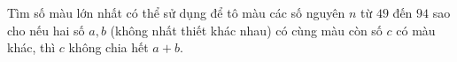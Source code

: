 \ifshowproblem
\begin{problem}\label{example:THA-2015-TSTST-E-P3}
    Tìm số màu lớn nhất có thể sử dụng để tô màu các số nguyên \( n \) từ \( 49 \) đến \( 94 \)
    sao cho nếu hai số \( a, b \) (không nhất thiết khác nhau) có cùng màu còn số \( c \) có màu khác, thì \( c \) không chia hết \( a + b \).
\end{problem}
\fi

\footnotemark
{}
\fi